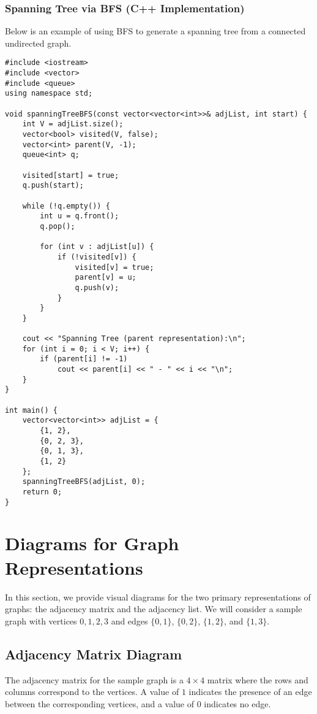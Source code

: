 \subsubsection{Spanning Tree via BFS (C++ Implementation)}
Below is an example of using BFS to generate a spanning tree from a connected undirected graph.
\begin{lstlisting}[caption={Spanning Tree using BFS in C++}]
#include <iostream>
#include <vector>
#include <queue>
using namespace std;

void spanningTreeBFS(const vector<vector<int>>& adjList, int start) {
    int V = adjList.size();
    vector<bool> visited(V, false);
    vector<int> parent(V, -1);
    queue<int> q;

    visited[start] = true;
    q.push(start);

    while (!q.empty()) {
        int u = q.front();
        q.pop();

        for (int v : adjList[u]) {
            if (!visited[v]) {
                visited[v] = true;
                parent[v] = u;
                q.push(v);
            }
        }
    }

    cout << "Spanning Tree (parent representation):\n";
    for (int i = 0; i < V; i++) {
        if (parent[i] != -1)
            cout << parent[i] << " - " << i << "\n";
    }
}

int main() {
    vector<vector<int>> adjList = {
        {1, 2},
        {0, 2, 3},
        {0, 1, 3},
        {1, 2}
    };
    spanningTreeBFS(adjList, 0);
    return 0;
}
\end{lstlisting}

\section{Diagrams for Graph Representations}

In this section, we provide visual diagrams for the two primary representations of graphs: the adjacency matrix and the adjacency list. We will consider a sample graph with vertices \(0,1,2,3\) and edges \(\{0,1\}\), \(\{0,2\}\), \(\{1,2\}\), and \(\{1,3\}\).

\subsection{Adjacency Matrix Diagram}
The adjacency matrix for the sample graph is a \(4 \times 4\) matrix where the rows and columns correspond to the vertices. A value of \(1\) indicates the presence of an edge between the corresponding vertices, and a value of \(0\) indicates no edge.


